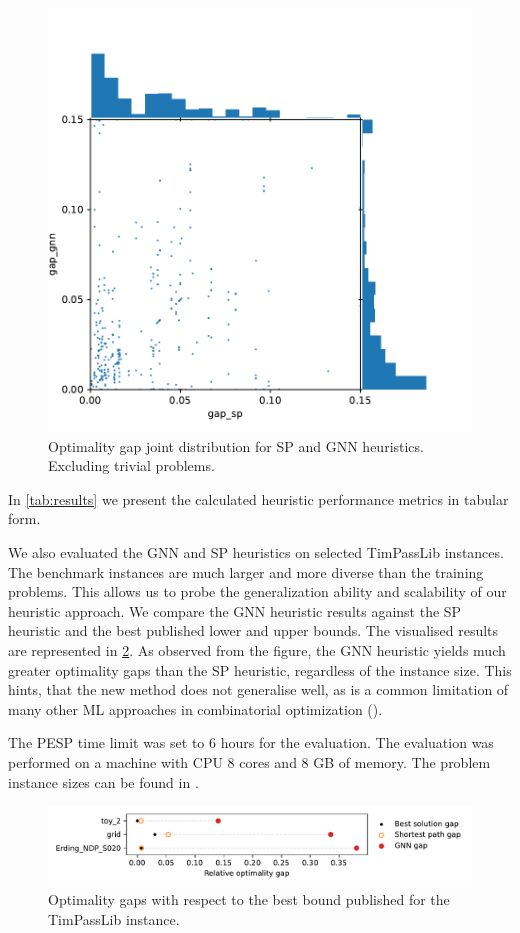 \documentclass[english, 12pt, a4paper, sci, utf8, a-2b, online]{aaltothesis}
\begin{document}
\begin{figure}
    \centering
    \includegraphics[width=0.75\linewidth]{figures/gap-gap-excl-trivials.pdf}
    \caption{Optimality gap joint distribution for SP and GNN heuristics. Excluding trivial problems.}
    \label{fig:results-gg-excl-trivial}
\end{figure}

In \cref{tab:results} we present the calculated heuristic performance metrics in tabular form. 

We also evaluated the GNN and SP heuristics on selected TimPassLib instances. The benchmark instances are much larger and more diverse than the training problems. This allows us to probe the generalization ability and scalability of our heuristic approach. We compare the GNN heuristic results against the SP heuristic and the best published lower and upper bounds. The visualised results are represented in \cref{fig:eval-timpasslib}. As observed from the figure, the GNN heuristic yields much greater optimality gaps than the SP heuristic, regardless of the instance size. This hints, that the new method does not generalise well, as is a common limitation of many other ML approaches in combinatorial optimization (\cite{cappart2023combinatorial}).


The PESP time limit was set to 6 hours for the evaluation. The evaluation was performed on a machine with CPU 8 cores and 8 GB of memory. The problem instance sizes can be found in \cite{schiewe2023introducing}.

\begin{figure}
    \centering
    \includegraphics[width=\linewidth]{figures/eval-timpasslib.pdf}
    \caption{Optimality gaps with respect to the best bound published for the TimPassLib instance.} 
    \label{fig:eval-timpasslib}
\end{figure}
\end{document}
